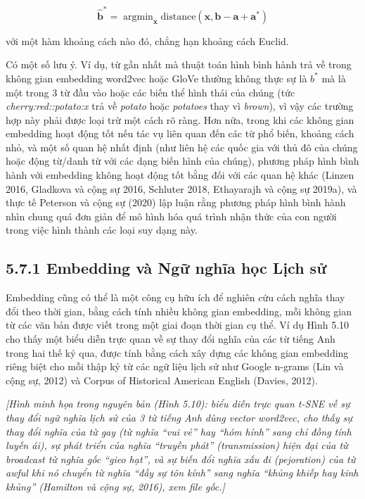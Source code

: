 \begin{equation}
\hat{\mathbf{b}}^* = \operatorname{argmin}_{\mathbf{x}} \text{distance}(\mathbf{x}, \mathbf{b}-\mathbf{a}+\mathbf{a}^*) \tag{5.28}
\end{equation}

với một hàm khoảng cách nào đó, chẳng hạn khoảng cách Euclid.

Có một số lưu ý. Ví dụ, từ gần nhất mà thuật toán hình bình hành trả về trong không gian embedding word2vec hoặc GloVe thường không thực sự là $b^*$ mà là một trong 3 từ đầu vào hoặc các biến thể hình thái của chúng (tức \emph{cherry:red::potato:x} trả về \emph{potato} hoặc \emph{potatoes} thay vì \emph{brown}), vì vậy các trường hợp này phải được loại trừ một cách rõ ràng. Hơn nữa, trong khi các không gian embedding hoạt động tốt nếu tác vụ liên quan đến các từ phổ biến, khoảng cách nhỏ, và một số quan hệ nhất định (như liên hệ các quốc gia với thủ đô của chúng hoặc động từ/danh từ với các dạng biến hình của chúng), phương pháp hình bình hành với embedding không hoạt động tốt bằng đối với các quan hệ khác (Linzen 2016, Gladkova và cộng sự 2016, Schluter 2018, Ethayarajh và cộng sự 2019a), và thực tế Peterson và cộng sự (2020) lập luận rằng phương pháp hình bình hành nhìn chung quá đơn giản để mô hình hóa quá trình nhận thức của con người trong việc hình thành các loại suy dạng này.

\subsection*{5.7.1 Embedding và Ngữ nghĩa học Lịch sử}

Embedding cũng có thể là một công cụ hữu ích để nghiên cứu cách nghĩa thay đổi theo thời gian, bằng cách tính nhiều không gian embedding, mỗi không gian từ các văn bản được viết trong một giai đoạn thời gian cụ thể. Ví dụ Hình 5.10 cho thấy một biểu diễn trực quan về sự thay đổi nghĩa của các từ tiếng Anh trong hai thế kỷ qua, được tính bằng cách xây dựng các không gian embedding riêng biệt cho mỗi thập kỷ từ các ngữ liệu lịch sử như Google n-grams (Lin và cộng sự, 2012) và Corpus of Historical American English (Davies, 2012).

\textit{[Hình minh họa trong nguyên bản (Hình 5.10): biểu diễn trực quan t-SNE về sự thay đổi ngữ nghĩa lịch sử của 3 từ tiếng Anh dùng vector word2vec, cho thấy sự thay đổi nghĩa của từ \emph{gay} (từ nghĩa ``vui vẻ'' hay ``hóm hỉnh'' sang chỉ đồng tính luyến ái), sự phát triển của nghĩa ``truyền phát'' (transmission) hiện đại của từ \emph{broadcast} từ nghĩa gốc ``gieo hạt'', và sự biến đổi nghĩa xấu đi (pejoration) của từ \emph{awful} khi nó chuyển từ nghĩa ``đầy sự tôn kính'' sang nghĩa ``khủng khiếp hay kinh khủng'' (Hamilton và cộng sự, 2016), xem file gốc.]}


